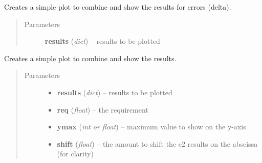 \documentclass[a4paper,12pt,english]{sphinxmanual}
\begin{document}

\begin{fulllineitems}
\label{reduction:analysis.biasCalibration.plotNumberOfFramesDelta}
Creates a simple plot to combine and show the results for errors (delta).
\begin{quote}\begin{description}
\item[{Parameters}] \leavevmode
\textbf{results} (\emph{dict}) -- results to be plotted

\end{description}\end{quote}

\end{fulllineitems}


\begin{fulllineitems}
\label{reduction:analysis.biasCalibration.plotNumberOfFramesSigma}
Creates a simple plot to combine and show the results.
\begin{quote}\begin{description}
\item[{Parameters}] \leavevmode\begin{itemize}
\item {} 
\textbf{results} (\emph{dict}) -- results to be plotted

\item {} 
\textbf{req} (\emph{float}) -- the requirement

\item {} 
\textbf{ymax} (\emph{int or float}) -- maximum value to show on the y-axis

\item {} 
\textbf{shift} (\emph{float}) -- the amount to shift the e2 results on the abscissa (for clarity)

\end{itemize}

\end{description}\end{quote}

\end{fulllineitems}
\end{document}
